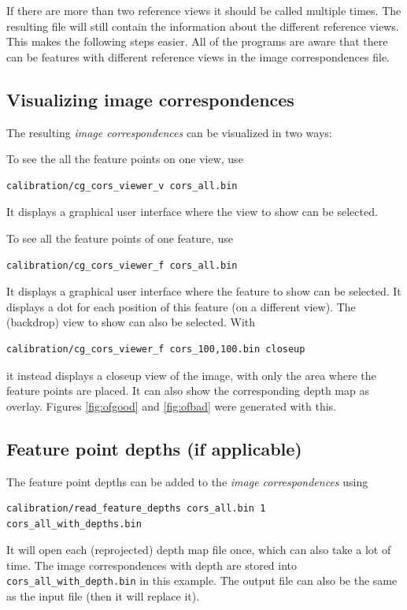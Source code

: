 \documentclass[11pt]{scrreprt}
\begin{document}
\noindent If there are more than two reference views it should be called multiple times. The resulting file will still contain the information about the different reference views. This makes the following steps easier. All of the programs are aware that there can be features with different reference views in the image correspondences file.


\subsection{Visualizing image correspondences}
The resulting \emph{image correspondences} can be visualized in two ways:

To see the all the feature points on one view, use
\begin{lstlisting}[language=bash]
calibration/cg_cors_viewer_v cors_all.bin
\end{lstlisting}
It displays a graphical user interface where the view to show can be selected.

To see all the feature points of one feature, use
\begin{lstlisting}[language=bash]
calibration/cg_cors_viewer_f cors_all.bin 
\end{lstlisting}

\noindent It displays a graphical user interface where the feature to show can be selected. It displays a dot for each position of this feature (on a different view). The (backdrop) view to show can also be selected. With
\begin{lstlisting}[language=bash]
calibration/cg_cors_viewer_f cors_100,100.bin closeup
\end{lstlisting}
it instead displays a closeup view of the image, with only the area where the feature points are placed. It can also show the corresponding depth map as overlay. Figures \ref{fig:ofgood} and \ref{fig:ofbad} were generated with this.



\subsection{Feature point depths (if applicable)}
The feature point depths can be added to the \emph{image correspondences} using
\begin{lstlisting}[language=bash]
calibration/read_feature_depths cors_all.bin 1
cors_all_with_depths.bin
\end{lstlisting}

\noindent It will open each (reprojected) depth map file once, which can also take a lot of time. The image correspondences with depth are stored into \texttt{cors\_all\_with\_depth.bin} in this example. The output file can also be the same as the input file (then it will replace it).
\end{document}
